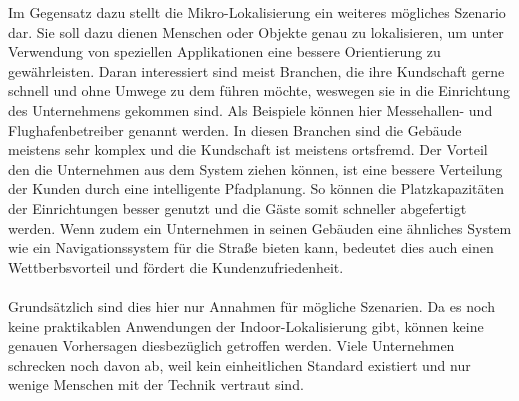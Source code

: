 Im Gegensatz dazu stellt die Mikro-Lokalisierung ein weiteres mögliches Szenario dar. Sie soll dazu dienen Menschen oder Objekte genau zu lokalisieren, um unter Verwendung von speziellen Applikationen eine bessere Orientierung zu gewährleisten. Daran interessiert sind meist Branchen, die ihre Kundschaft gerne schnell und ohne Umwege zu dem führen möchte, weswegen sie in die Einrichtung des Unternehmens gekommen sind. Als Beispiele können hier Messehallen- und Flughafenbetreiber genannt werden. In diesen Branchen sind die Gebäude meistens sehr komplex und die Kundschaft ist meistens ortsfremd. Der Vorteil den die Unternehmen aus dem System ziehen können, ist eine bessere Verteilung der Kunden durch eine intelligente Pfadplanung. So können die Platzkapazitäten der Einrichtungen besser genutzt und die Gäste somit schneller abgefertigt werden. Wenn zudem ein Unternehmen in seinen Gebäuden eine ähnliches System wie ein Navigationssystem für die Straße bieten kann, bedeutet dies auch einen Wettberbsvorteil und fördert die Kundenzufriedenheit. \\ \\
Grundsätzlich sind dies hier nur Annahmen für mögliche Szenarien. Da es noch keine praktikablen Anwendungen der Indoor-Lokalisierung gibt, können keine genauen Vorhersagen diesbezüglich getroffen werden. Viele Unternehmen schrecken noch davon ab, weil kein einheitlichen Standard existiert und nur wenige Menschen mit der Technik vertraut sind.  
